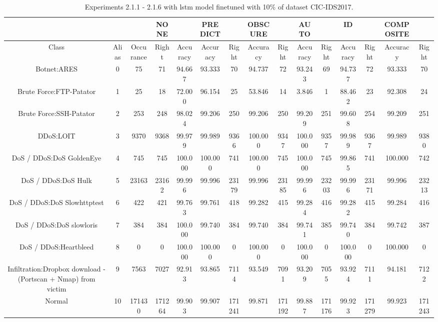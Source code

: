 \begin{table}[htb]
    \centering
    \caption{Experiments 2.1.1 - 2.1.6 with \gls{lstm} model finetuned with 10\% of dataset CIC-IDS2017.}
    \label{table:results:lstm:flows_10}
    \begin{tabular}{@{}ccccccccccccccc@{}}
        \toprule
         &  &  & NONE &  & PREDICT &  & OBSCURE &  & AUTO &  & ID &  & COMPOSITE &  \\
        \midrule
        Class &  Alias &  Occurance &  Right &  Accuracy &  Accuracy &  Right &  Accuracy &  Right &  Accuracy &  Right &  Accuracy &  Right &  Accuracy &  Right \\
        Botnet:ARES &  0 &  75 &  71 &  94.667 &  93.333 &  70 &  94.737 &  72 &  93.243 &  69 &  94.737 &  72 &  93.333 &  70 \\
        Brute Force:FTP-Patator &  1 &  25 &  18 &  72.000 &  96.154 &  25 &  53.846 &  14 &  3.846 &  1 &  88.462 &  23 &  92.308 &  24 \\
        Brute Force:SSH-Patator &  2 &  253 &  248 &  98.024 &  99.206 &  250 &  99.206 &  250 &  99.209 &  251 &  99.608 &  254 &  99.209 &  251 \\
        DDoS:LOIT &  3 &  9370 &  9368 &  99.979 &  99.989 &  9366 &  100.000 &  9347 &  100.000 &  9357 &  99.989 &  9367 &  99.989 &  9380 \\
        DoS / DDoS:DoS GoldenEye &  4 &  745 &  745 &  100.000 &  100.000 &  741 &  100.000 &  745 &  100.000 &  745 &  99.865 &  741 &  100.000 &  742 \\
        DoS / DDoS:DoS Hulk &  5 &  23163 &  23162 &  99.996 &  99.996 &  23179 &  99.996 &  23185 &  99.996 &  23203 &  99.996 &  23171 &  99.996 &  23213 \\
        DoS / DDoS:DoS Slowhttptest &  6 &  422 &  421 &  99.763 &  99.761 &  418 &  99.282 &  415 &  99.284 &  416 &  99.282 &  415 &  99.284 &  416 \\
        DoS / DDoS:DoS slowloris &  7 &  384 &  384 &  100.000 &  99.740 &  384 &  99.740 &  384 &  99.741 &  385 &  99.740 &  384 &  99.742 &  387 \\
        DoS / DDoS:Heartbleed &  8 &  0 &  0 &  100.000 &  100.000 &  0 &  100.000 &  0 &  100.000 &  0 &  100.000 &  0 &  100.000 &  0 \\
        Infiltration:Dropbox download - (Portscan + Nmap) from victim &  9 &  7563 &  7027 &  92.913 &  93.865 &  7114 &  93.549 &  7091 &  93.209 &  7055 &  93.924 &  7111 &  94.181 &  7122 \\
        Normal &  10 &  171430 &  171264 &  99.903 &  99.907 &  171241 &  99.871 &  171192 &  99.887 &  171176 &  99.923 &  171279 &  99.923 &  171243 \\

\end{tabular}
\end{table}
